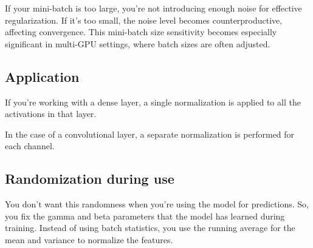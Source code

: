\documentclass[11pt]{article}
\begin{document}
If your mini-batch is too large, you're not introducing enough noise for effective regularization. If it's too small, the noise level becomes counterproductive, affecting convergence. This mini-batch size sensitivity becomes especially significant in multi-GPU settings, where batch sizes are often adjusted.

\subsection{Application}

If you're working with a dense layer, a single normalization is applied to all the activations in that layer.

In the case of a convolutional layer, a separate normalization is performed for each channel.

\subsection{Randomization during use}

You don't want this randomness when you're using the model for predictions. So, you fix the gamma and beta parameters that the model has learned during training. Instead of using batch statistics, you use the running average for the mean and variance to normalize the features.

\printbibliography
\end{document}
